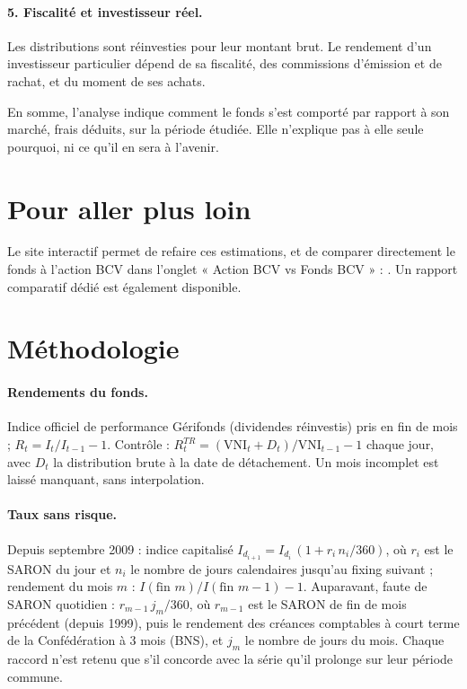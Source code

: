 \documentclass[11pt,a4paper]{article}
\begin{document}
\paragraph{5. Fiscalité et investisseur réel.} Les distributions sont réinvesties pour leur montant brut. Le rendement d'un investisseur particulier dépend de sa fiscalité, des commissions d'émission et de rachat, et du moment de ses achats.

En somme, l'analyse indique comment le fonds s'est comporté par rapport à son marché, frais déduits, sur la période étudiée. Elle n'explique pas à elle seule pourquoi, ni ce qu'il en sera à l'avenir.

\section{Pour aller plus loin}

Le site interactif permet de refaire ces estimations, et de comparer directement le fonds à l'action BCV dans l'onglet « Action BCV vs Fonds BCV » : \URLSite. Un rapport comparatif dédié est également disponible.

\appendix
\section{Méthodologie}

\paragraph{Rendements du fonds.} Indice officiel de performance Gérifonds (dividendes réinvestis) pris en fin de mois ; $R_t = I_t / I_{t-1} - 1$. Contrôle : $R^{TR}_t = (\mathrm{VNI}_t + D_t)/\mathrm{VNI}_{t-1} - 1$ chaque jour, avec $D_t$ la distribution brute à la date de détachement. Un mois incomplet est laissé manquant, sans interpolation.

\paragraph{Taux sans risque.} Depuis septembre 2009 : indice capitalisé $I_{d_{i+1}} = I_{d_i}\,(1 + r_i\, n_i/360)$, où $r_i$ est le SARON du jour et $n_i$ le nombre de jours calendaires jusqu'au fixing suivant ; rendement du mois $m$ : $I(\text{fin } m)/I(\text{fin } m-1) - 1$. Auparavant, faute de SARON quotidien : $r_{m-1}\, j_m/360$, où $r_{m-1}$ est le SARON de fin de mois précédent (depuis 1999), puis le rendement des créances comptables à court terme de la Confédération à 3 mois (BNS), et $j_m$ le nombre de jours du mois. Chaque raccord n'est retenu que s'il concorde avec la série qu'il prolonge sur leur période commune.
\end{document}
